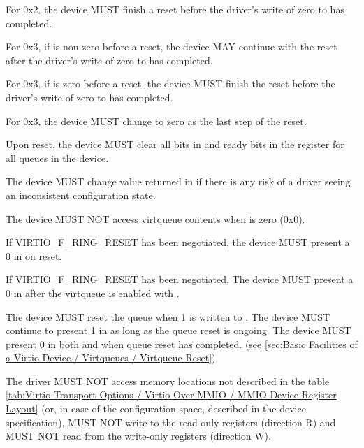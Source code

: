For  0x2, the device MUST finish a reset before the driver's
write of zero to  has completed.

For  0x3, if  is non-zero before a reset, the
device MAY continue with the reset after the driver's write of zero to
 has completed.

For  0x3, if  is zero before a reset, the device
MUST finish the reset before the driver's write of zero to  has
completed.

For  0x3, the device MUST change  to zero as the
last step of the reset.

Upon reset, the device MUST clear all bits in  and ready bits in the
 register for all queues in the device.

The device MUST change value returned in  if there is any risk of a
driver seeing an inconsistent configuration state.

The device MUST NOT access virtqueue contents when  is zero (0x0).

If VIRTIO_F_RING_RESET has been negotiated, the device MUST present a 0 in
 on reset.

If VIRTIO_F_RING_RESET has been negotiated, The device MUST present a 0 in
 after the virtqueue is enabled with .

The device MUST reset the queue when 1 is written to . The
device MUST continue to present 1 in  as long as the queue reset
is ongoing. The device MUST present 0 in both  and 
when queue reset has completed.
(see \ref{sec:Basic Facilities of a Virtio Device / Virtqueues / Virtqueue Reset}).

The driver MUST NOT access memory locations not described in the
table \ref{tab:Virtio Transport Options / Virtio Over MMIO / MMIO Device Register Layout}
(or, in case of the configuration space, described in the device specification),
MUST NOT write to the read-only registers (direction R) and
MUST NOT read from the write-only registers (direction W).

